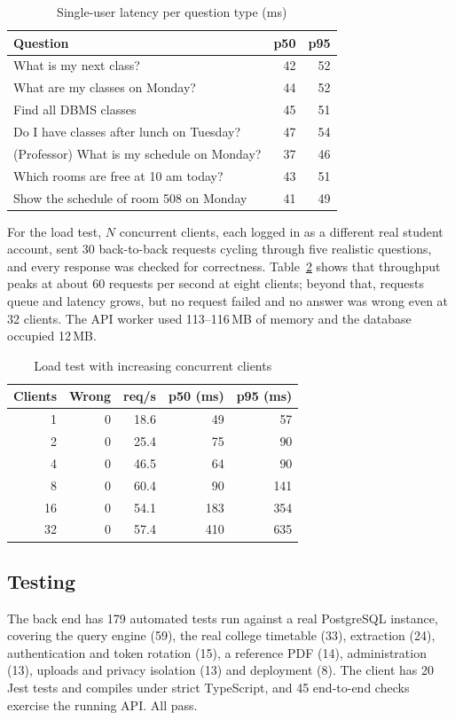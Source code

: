 \documentclass[conference]{IEEEtran}
\begin{document}
\begin{table}[t]
\centering
\caption{Single-user latency per question type (ms)}
\label{tab:latency}
\setlength{\tabcolsep}{4pt}
\begin{tabular}{@{}lrr@{}}
\toprule
\textbf{Question} & \textbf{p50} & \textbf{p95}\\
\midrule
What is my next class? & 42 & 52\\
What are my classes on Monday? & 44 & 52\\
Find all DBMS classes & 45 & 51\\
Do I have classes after lunch on Tuesday? & 47 & 54\\
(Professor) What is my schedule on Monday? & 37 & 46\\
Which rooms are free at 10 am today? & 43 & 51\\
Show the schedule of room 508 on Monday & 41 & 49\\
\bottomrule
\end{tabular}
\end{table}

For the load test, $N$ concurrent clients, each logged in as a different real student account, sent 30
back-to-back requests cycling through five realistic questions, and every response was checked for
correctness. Table~\ref{tab:load} shows that throughput peaks at about 60 requests per second at eight
clients; beyond that, requests queue and latency grows, but no request failed and no answer was wrong even
at 32 clients. The API worker used 113--116\,MB of memory and the database occupied 12\,MB.

\begin{table}[t]
\centering
\caption{Load test with increasing concurrent clients}
\label{tab:load}
\begin{tabular}{@{}rrrrr@{}}
\toprule
\textbf{Clients} & \textbf{Wrong} & \textbf{req/s} & \textbf{p50 (ms)} & \textbf{p95 (ms)}\\
\midrule
1 & 0 & 18.6 & 49 & 57\\
2 & 0 & 25.4 & 75 & 90\\
4 & 0 & 46.5 & 64 & 90\\
8 & 0 & 60.4 & 90 & 141\\
16 & 0 & 54.1 & 183 & 354\\
32 & 0 & 57.4 & 410 & 635\\
\bottomrule
\end{tabular}
\end{table}

\subsection{Testing}
The back end has 179 automated tests run against a real PostgreSQL instance, covering the query engine
(59), the real college timetable (33), extraction (24), authentication and token rotation (15), a reference
PDF (14), administration (13), uploads and privacy isolation (13) and deployment (8). The client has 20
Jest tests and compiles under strict TypeScript, and 45 end-to-end checks exercise the running API. All
pass.
\end{document}
